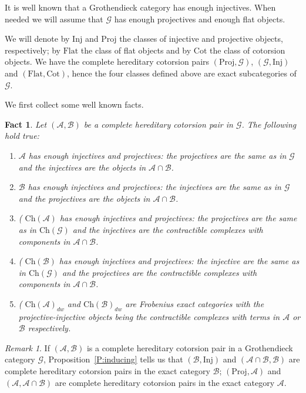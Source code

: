 \documentclass[11pt,a4paper,reqno]{amsart}
\newcommand{\A}{\mathcal{A}}
\newcommand{\B}{\mathcal{B}}
\newcommand{\G}{\mathcal{G}}
\newcommand{\Ch}{\mathrm{Ch}}
\newcommand{\Flat}{\mathrm{Flat}}
\newcommand{\Cot}{\mathrm{Cot}}
\newcommand{\Inj}{\mathrm{Inj}}
\newcommand{\Proj}{\mathrm{Proj}}
\theoremstyle{plain}
\newtheorem{fact}[thm]{Fact}
\theoremstyle{definition}
\theoremstyle{remark}
\newtheorem{rem}[thm]{Remark}
\begin{document}
 It is well known that a Grothendieck category has enough injectives.
When needed we will assume that $\G$ has enough projectives and enough flat objects.

We will denote by $\Inj$ and $\Proj$ the classes of injective and projective objects, respectively; by $\Flat$ the class of flat objects and by $\Cot$ the class of cotorsion objects.  We have the complete hereditary cotorsion pairs $(\Proj, \G)$, $(\G, \Inj)$ and $(\Flat, \Cot)$, hence the four classes defined above are exact subcategories of $\G$.

We first collect some well known facts.
\begin{fact}\label{F:proj-inj} Let $(\A, \B)$ be a complete hereditary cotorsion pair in $\G$. The following hold true:
\begin{enumerate}
\item $\A$ has enough injectives and projectives: the projectives are the same as in $\G$ and the injectives are the objects in $\A\cap\B$.
\item $\B$ has enough injectives and projectives: the injectives are the same as in $\G$ and the projectives are the objects in $\A\cap\B$.
\item (\cite[Corollary 2.9]{G7} $\Ch(\A)$ has enough injectives and projectives: the projectives are the same as in $\Ch(\G)$ and the injectives are the contractible complexes with components in $\A\cap\B$.
\item (\cite[Corollary 2.9]{G7} $\Ch(\B)$ has enough injectives and projectives: the injective are the same as in $\Ch(\G)$ and the projectives are the contractible complexes with components in $\A\cap\B$.
\item (\cite[Corollary 2.8]{G7} $\Ch(\A)_{dw}$ and $\Ch(\B)_{dw}$ are Frobenius exact categories with the  projective-injective objects being the contractible complexes with terms in $\A$ or $\B$ respectively.
\end{enumerate}
\end{fact}

%
%
%

\begin{rem}\label{R:induced} If $(\A, \B)$ is a complete hereditary cotorsion pair in a Grothendieck category $\G$, Proposition~\ref{P:inducing} tells us that $(\B, \Inj)$ and $(\A\cap \B, \B)$  are complete hereditary cotorsion pairs in the exact category $\B$; $(\Proj, \A)$ and $(\A, \A\cap \B)$ are complete hereditary cotorsion pairs  in the exact category $\A$.
\end{rem}
\end{document}
